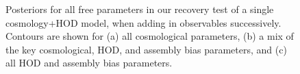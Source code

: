 \begin{figure}[p!]%
\centering
{}
\vspace{1em}
\caption{Posteriors for all free parameters in our recovery test of a single cosmology+HOD model, when adding in observables successively. Contours are shown for (a) all cosmological parameters, (b) a mix of the key cosmological, HOD, and assembly bias parameters, and (c) all HOD and assembly bias parameters.}
\end{figure}

